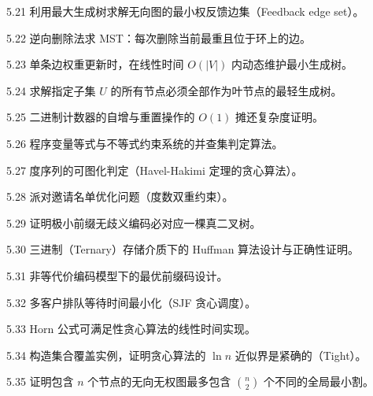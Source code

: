 \begin{exercise}{5.21}
利用最大生成树求解无向图的最小权反馈边集（Feedback edge set）。
\end{exercise}

\begin{exercise}{5.22}
逆向删除法求 MST：每次删除当前最重且位于环上的边。
\end{exercise}

\begin{exercise}{5.23}
单条边权重更新时，在线性时间 $O(|V|)$ 内动态维护最小生成树。
\end{exercise}

\begin{exercise}{5.24}
求解指定子集 $U$ 的所有节点必须全部作为叶节点的最轻生成树。
\end{exercise}

\begin{exercise}{5.25}
二进制计数器的自增与重置操作的 $O(1)$ 摊还复杂度证明。
\end{exercise}

\begin{exercise}{5.26}
程序变量等式与不等式约束系统的并查集判定算法。
\end{exercise}

\begin{exercise}{5.27}
度序列的可图化判定（Havel-Hakimi 定理的贪心算法）。
\end{exercise}

\begin{exercise}{5.28}
派对邀请名单优化问题（度数双重约束）。
\end{exercise}

\begin{exercise}{5.29}
证明极小前缀无歧义编码必对应一棵真二叉树。
\end{exercise}

\begin{exercise}{5.30}
三进制（Ternary）存储介质下的 Huffman 算法设计与正确性证明。
\end{exercise}

\begin{exercise}{5.31}
非等代价编码模型下的最优前缀码设计。
\end{exercise}

\begin{exercise}{5.32}
多客户排队等待时间最小化（SJF 贪心调度）。
\end{exercise}

\begin{exercise}{5.33}
Horn 公式可满足性贪心算法的线性时间实现。
\end{exercise}

\begin{exercise}{5.34}
构造集合覆盖实例，证明贪心算法的 $\ln n$ 近似界是紧确的（Tight）。
\end{exercise}

\begin{exercise}{5.35}
证明包含 $n$ 个节点的无向无权图最多包含 $\binom{n}{2}$ 个不同的全局最小割。
\end{exercise}
